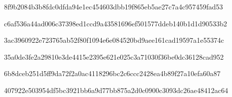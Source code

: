 \par\noindent\begin{minipage}{\linewidth}
\par
{\footnotesize\ttfamily 8f9b2084b3b8fdc0dfda94e1ec454603dbb19f865eb5ae27c7a4c957459fad53}\par
\end{minipage}\par\smallskip
\par\noindent\begin{minipage}{\linewidth}
\par
{\footnotesize\ttfamily c6af536a44ad006c37398ed1ccd9a43581696ef501577ddeb140b1d1d90533b2}\par
\end{minipage}\par\smallskip
\par\noindent\begin{minipage}{\linewidth}
\par
{\footnotesize\ttfamily 3ac3960922e723765ab52f80f1094e6e084520bd9aee161cad19597a1e55374c}\par
\end{minipage}\par\smallskip
\par\noindent\begin{minipage}{\linewidth}
\par
{\footnotesize\ttfamily 35a0de3fe2a29810e3de4415e2395e621e025c3a71030f36be0dc36128cad952}\par
\end{minipage}\par\smallskip
\par\noindent\begin{minipage}{\linewidth}
\par
{\footnotesize\ttfamily 6b8dceb251d5ff9da72f2a0ac4118296bc2c6ccc2428ea4b89f27a10efa60a87}\par
\end{minipage}\par\smallskip
\par\noindent\begin{minipage}{\linewidth}
\par
{\footnotesize\ttfamily 407922e503954df5bc3921bb6a9d77bb875a2d0c0900c3093dc26ae48412ac64}\par
\end{minipage}\par\smallskip
